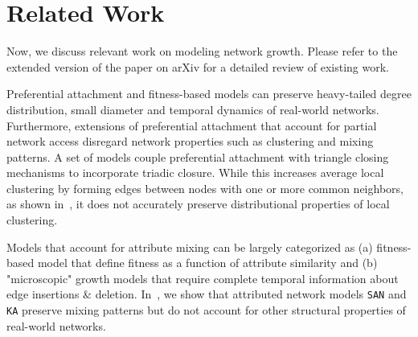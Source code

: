
\section{Related Work}
\label{sec:Related Work}
Now, we discuss relevant work on modeling network growth.
Please refer to the
extended version of the paper on arXiv for a detailed review of existing work.

Preferential attachment and fitness-based models \cite{bell2017network,medo2011temporal,bianconi2001bose,caldarelli2002scale}
can preserve heavy-tailed degree distribution, small diameter \cite{bollobas2004diameter} and temporal dynamics \cite{wang2013quantifying}
of real-world networks. Furthermore, extensions of preferential attachment \cite{mossa2002truncation,zeng2005construction,wang2009local} that account for
partial network access disregard network properties such as clustering and mixing patterns.
A set of models
\cite{holme2002growing,klemm2002highly,leskovec2008microscopic}
couple preferential attachment with triangle closing mechanisms to incorporate triadic closure.
While this increases {average} local clustering by forming edges between nodes
with one or more common neighbors, as shown in~, it does not
accurately preserve distributional properties of local clustering.


Models \cite{de2013scale,karimi2017visibility,gong2012evolution,zheleva2009co}
that account for attribute mixing can be largely categorized as (a) fitness-based model that define fitness as a function of
attribute similarity and (b) "microscopic" growth models  that require
complete temporal information about edge insertions \& deletion.
In~, we show that attributed network models
\texttt{SAN} and \texttt{KA} preserve mixing patterns but do not account for other
structural properties of real-world networks.

